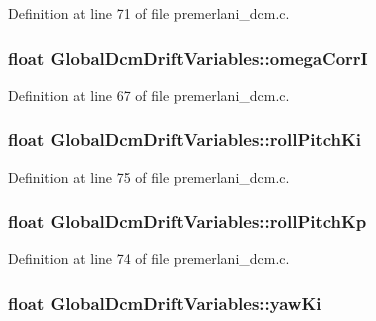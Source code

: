 Definition at line 71 of file premerlani\-\_\-dcm.\-c.

\hypertarget{struct_global_dcm_drift_variables_a08c07c4b4d2fbc994b2eee3f0d4772b1}{
\subsubsection[{omega\-Corr\-I}]{\setlength{\rightskip}{0pt plus 5cm}float Global\-Dcm\-Drift\-Variables\-::omega\-Corr\-I}}\label{struct_global_dcm_drift_variables_a08c07c4b4d2fbc994b2eee3f0d4772b1}


Definition at line 67 of file premerlani\-\_\-dcm.\-c.

\hypertarget{struct_global_dcm_drift_variables_a527cbde51d73c3c3fa34e5ce3b17454a}{
\subsubsection[{roll\-Pitch\-Ki}]{\setlength{\rightskip}{0pt plus 5cm}float Global\-Dcm\-Drift\-Variables\-::roll\-Pitch\-Ki}}\label{struct_global_dcm_drift_variables_a527cbde51d73c3c3fa34e5ce3b17454a}


Definition at line 75 of file premerlani\-\_\-dcm.\-c.

\hypertarget{struct_global_dcm_drift_variables_a99a127bcaabe2e53c45a56eb568bc020}{
\subsubsection[{roll\-Pitch\-Kp}]{\setlength{\rightskip}{0pt plus 5cm}float Global\-Dcm\-Drift\-Variables\-::roll\-Pitch\-Kp}}\label{struct_global_dcm_drift_variables_a99a127bcaabe2e53c45a56eb568bc020}


Definition at line 74 of file premerlani\-\_\-dcm.\-c.

\hypertarget{struct_global_dcm_drift_variables_a81b393df9390fedc959c476b3c7381c6}{
\subsubsection[{yaw\-Ki}]{\setlength{\rightskip}{0pt plus 5cm}float Global\-Dcm\-Drift\-Variables\-::yaw\-Ki}}\label{struct_global_dcm_drift_variables_a81b393df9390fedc959c476b3c7381c6}


